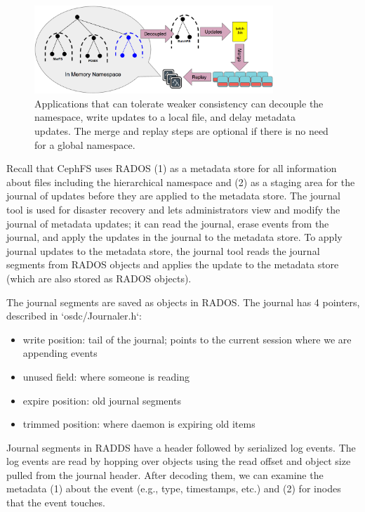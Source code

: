 \documentclass[preprint]{sigplanconf-eurosys}
\begin{document}
\begin{figure}[tb]
\centering
\includegraphics[width=90mm]{figures/fig-decouple.png}
\caption{Applications that can tolerate weaker consistency can decouple the
namespace, write updates to a local file, and delay metadata updates. The merge
and replay steps are optional if there is no need for a global namespace.
}\label{fig:decouple}
\end{figure}

Recall that CephFS uses RADOS (1) as a metadata store for all information about
files including the hierarchical namespace and (2) as a staging area for the
journal of updates before they are applied to the metadata store.  The journal
tool is used for disaster recovery and lets administrators view and modify the
journal of metadata updates; it can read the journal, erase events from the
journal, and apply the updates in the journal to the metadata store.  To apply
journal updates to the metadata store, the journal tool reads the journal
segments from RADOS objects and applies the update to the metadata store (which
are also stored as RADOS objects).

The journal segments are saved as objects in RADOS.  The journal has 4
pointers, described in `osdc/Journaler.h`:

\begin{itemize}
  \item write position: tail of the journal; points to the current session where we are appending events
  \item unused field: where someone is reading
  \item expire position: old journal segments
  \item trimmed position: where daemon is expiring old items
\end{itemize}

Journal segments in RADDS have a header followed by serialized log events. The
log events are read by hopping over objects using the read offset and object
size pulled from the journal header.  After decoding them, we can examine the
metadata (1) about the event (e.g., type, timestamps, etc.) and (2) for inodes
that the event touches.
\end{document}
